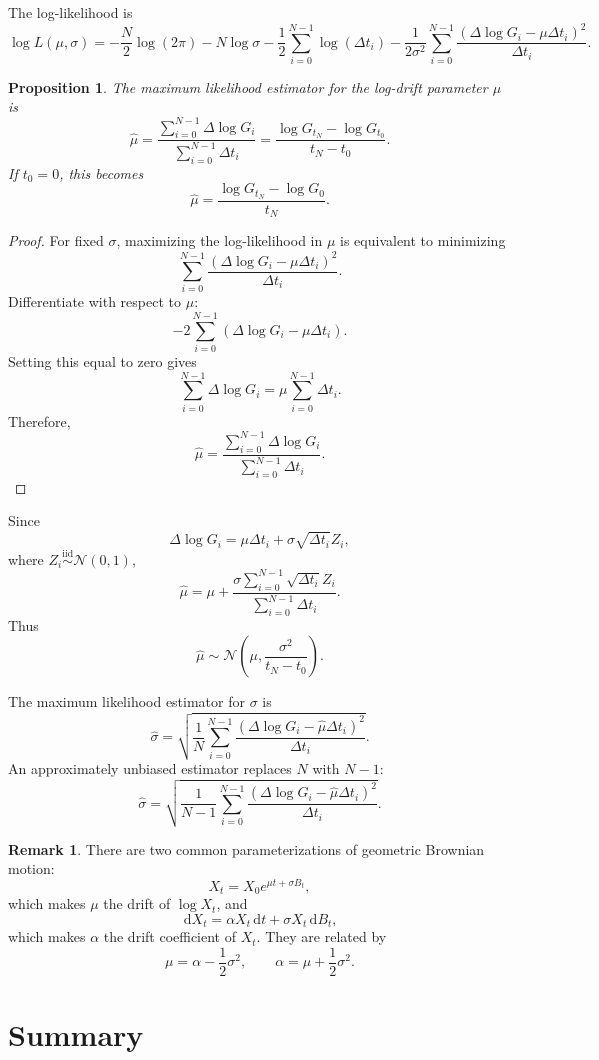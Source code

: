 \documentclass[12pt,oneside]{book}
\numberwithin{equation}{section}
\theoremstyle{definition}
\newtheorem{remark}{Remark}[section]
\theoremstyle{plain}
\newtheorem{proposition}{Proposition}[section]
\theoremstyle{remark}
\newcommand{\iid}{\overset{\text{iid}}{\sim}}
\newcommand{\dd}{\,\mathrm{d}}
\newcommand{\Normal}{\mathcal{N}}
\begin{document}
The log-likelihood is
\[
\log L(\mu,\sigma)
=
-\frac{N}{2}\log(2\pi)
-
N\log\sigma
-
\frac{1}{2}\sum_{i=0}^{N-1}\log(\Delta t_i)
-
\frac{1}{2\sigma^2}
\sum_{i=0}^{N-1}
\frac{(\Delta \log G_i-\mu\Delta t_i)^2}{\Delta t_i}.
\]

\begin{proposition}
The maximum likelihood estimator for the log-drift parameter $\mu$ is
\[
\hat{\mu}
=
\frac{\sum_{i=0}^{N-1}\Delta \log G_i}
{\sum_{i=0}^{N-1}\Delta t_i}
=
\frac{\log G_{t_N}-\log G_{t_0}}{t_N-t_0}.
\]
If $t_0=0$, this becomes
\[
\hat{\mu}
=
\frac{\log G_{t_N}-\log G_0}{t_N}.
\]
\end{proposition}

\begin{proof}
For fixed $\sigma$, maximizing the log-likelihood in $\mu$ is equivalent to minimizing
\[
\sum_{i=0}^{N-1}
\frac{(\Delta \log G_i-\mu\Delta t_i)^2}{\Delta t_i}.
\]
Differentiate with respect to $\mu$:
\[
-2\sum_{i=0}^{N-1}
(\Delta \log G_i-\mu\Delta t_i).
\]
Setting this equal to zero gives
\[
\sum_{i=0}^{N-1}\Delta \log G_i
=
\mu\sum_{i=0}^{N-1}\Delta t_i.
\]
Therefore,
\[
\hat{\mu}
=
\frac{\sum_{i=0}^{N-1}\Delta \log G_i}
{\sum_{i=0}^{N-1}\Delta t_i}.
\]
\end{proof}

Since
\[
\Delta \log G_i
=
\mu\Delta t_i+\sigma\sqrt{\Delta t_i}Z_i,
\]
where $Z_i\iid \Normal(0,1)$,
\[
\hat{\mu}
=
\mu
+
\frac{\sigma\sum_{i=0}^{N-1}\sqrt{\Delta t_i}Z_i}
{\sum_{i=0}^{N-1}\Delta t_i}.
\]
Thus
\[
\hat{\mu}
\sim
\Normal\left(
\mu,
\frac{\sigma^2}{t_N-t_0}
\right).
\]

The maximum likelihood estimator for $\sigma$ is
\[
\hat{\sigma}
=
\sqrt{
\frac{1}{N}
\sum_{i=0}^{N-1}
\frac{(\Delta \log G_i-\hat{\mu}\Delta t_i)^2}{\Delta t_i}
}.
\]
An approximately unbiased estimator replaces $N$ with $N-1$:
\[
\hat{\sigma}
=
\sqrt{
\frac{1}{N-1}
\sum_{i=0}^{N-1}
\frac{(\Delta \log G_i-\hat{\mu}\Delta t_i)^2}{\Delta t_i}
}.
\]

\begin{remark}
There are two common parameterizations of geometric Brownian motion:
\[
X_t=X_0e^{\mu t+\sigma B_t},
\]
which makes $\mu$ the drift of $\log X_t$, and
\[
\dd X_t=\alpha X_t\dd t+\sigma X_t\dd B_t,
\]
which makes $\alpha$ the drift coefficient of $X_t$. They are related by
\[
\mu=\alpha-\frac{1}{2}\sigma^2,
\qquad
\alpha=\mu+\frac{1}{2}\sigma^2.
\]
\end{remark}

\section{Summary}
\end{document}
